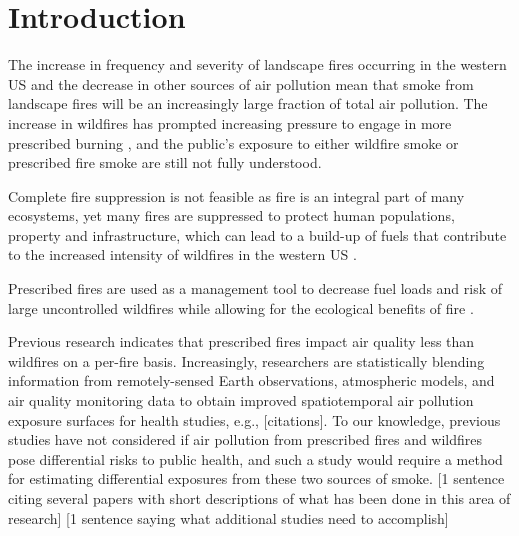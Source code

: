 \documentclass[authoryear]{elsarticle}
\begin{document}
\section{Introduction}
The increase in frequency and severity of landscape fires occurring in the western US \citep{Dennison2014,Steel2014} and the decrease in other sources of air pollution \citep{EPAPM25Trends2017} mean that smoke from landscape fires will be an increasingly large fraction of total air pollution.
The increase in wildfires has prompted increasing pressure to engage in more prescribed burning \citep{Stephens2005}, and the public's exposure to either wildfire smoke or prescribed fire smoke are still not fully understood.



Complete fire suppression is not feasible as fire is an integral part of many ecosystems, yet many fires are suppressed to protect human populations, property and infrastructure, which can lead to a build-up of fuels that contribute to the increased intensity of wildfires in the western US \citep{Bowman2009,Schoennagel2017}.

Prescribed fires are used as a management tool to decrease fuel loads and risk of large uncontrolled wildfires while allowing for the ecological benefits of fire \citep{Schoennagel2017}. 

Previous research indicates that prescribed fires impact air quality  less than wildfires on a per-fire basis.  
Increasingly, researchers are statistically blending information from remotely-sensed Earth observations, atmospheric models, and air quality monitoring data to obtain improved spatiotemporal air pollution exposure surfaces for health studies, e.g., [citations]. 
To our knowledge, previous studies have not considered if air pollution from prescribed fires and wildfires pose differential risks to public health, and such a study would require a method for estimating differential exposures from these two sources of smoke. 
[1 sentence citing several papers with short descriptions of what has been done in this area of research]
[1 sentence saying what additional studies need to accomplish]
\end{document}
